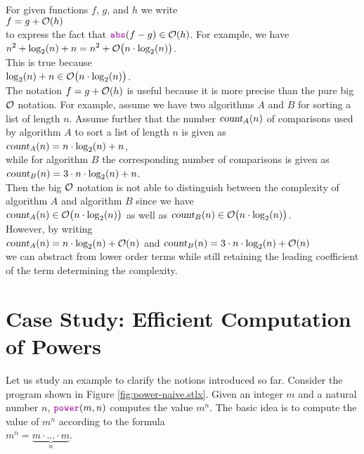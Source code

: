For given functions $f$, $g$, and $h$ we write
\\[0.2cm]
\hspace*{1.3cm}
$f = g + \mathcal{O}(h)$
\\[0.2cm]
to express the fact that  $\mytt{abs}(f - g) \in \Oh(h)$.  For example, we have 
\\[0.2cm]
\hspace*{1.3cm}
$\displaystyle n^2 + \log_2(n) + n = n^2 + \mathcal{O}\bigl(n \cdot \log_2(n)\bigr)$.
\\[0.2cm]
This is true because
\\[0.2cm]
\hspace*{1.3cm}
$\displaystyle \log_2(n) + n \in \mathcal{O}\bigl(n \cdot \log_2(n)\bigr)$.
\\[0.2cm] 
The notation $f = g + \mathcal{O}(h)$ is useful because it is more precise than the pure big $\mathcal{O}$
notation.  For example, assume we have two algorithms $A$ and $B$ for sorting a list of length
$n$.  Assume further that the number $\textsl{count}_A(n)$ of comparisons used by algorithm $A$ to sort a list of
length $n$ is given as
\\[0.2cm]
\hspace*{1.3cm}
$\displaystyle\textsl{count}_A(n) = n \cdot \log_2(n) + n$,
\\[0.2cm]
while for algorithm $B$ the corresponding number of comparisons is given as
\\[0.2cm]
\hspace*{1.3cm}
$\displaystyle\textsl{count}_B(n) = 3 \cdot n \cdot \log_2(n) + n$.
\\[0.2cm]
Then the big $\mathcal{O}$ notation is not able to distinguish between the complexity of algorithm $A$ and
algorithm $B$ since we have
\\[0.2cm]
\hspace*{1.3cm}
$\textsl{count}_A(n) \in \mathcal{O}\bigl(n \cdot \log_2(n)\bigr)$ \quad as well as \quad
$\textsl{count}_B(n) \in \mathcal{O}\bigl(n \cdot \log_2(n)\bigr)$.
\\[0.2cm]
However, by writing
\\[0.2cm]
\hspace*{1.3cm}
$\displaystyle\textsl{count}_A(n) = n \cdot \log_2(n) + \mathcal{O}(n)$ \quad and \quad
$\displaystyle\textsl{count}_B(n) = 3 \cdot n \cdot \log_2(n) + \mathcal{O}(n)$
\\[0.2cm]
we can abstract from lower order terms while still retaining the leading coefficient of the term
determining the complexity.  

\section[Computation of Powers]{Case Study:  Efficient Computation of Powers}
Let us study an example to clarify the notions introduced so far.  
Consider the program shown in Figure \ref{fig:power-naive.stlx}.  Given an integer $m$ and a
natural number $n$, $\mytt{power}(m, n)$ computes the value $m^n$.
The basic idea is to compute the value of $m^n$ according to the formula \\[0.2cm]
\hspace*{1.3cm} 
$m^n = \underbrace{m \cdot {\dots} \cdot m}_n$. 


